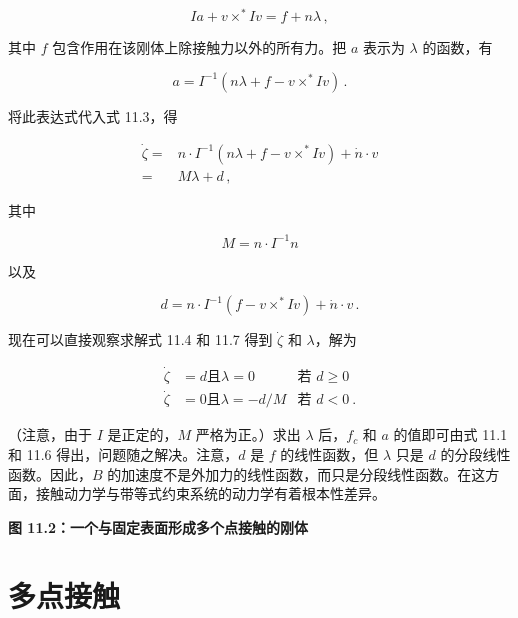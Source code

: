 \documentclass[10pt,a4paper]{book}
\theoremstyle{thmstyle} %
\theoremstyle{defstyle} %
\theoremstyle{prostyle} %
\begin{document}
$$
I a + v \times ^{*} I v = f + n \lambda \, ,
$$



其中 $f$ 包含作用在该刚体上除接触力以外的所有力。把 $a$ 表示为 $\lambda$ 的函数，有



$$
a = I ^{- 1} ( n \lambda + f - v \times ^{*} I v ) \, .
$$



将此表达式代入式 11.3，得



$$
\begin{array}{rl} { \dot { \zeta } = } & { n \cdot I ^{- 1} ( n \lambda + f - v \times ^{*} I v ) + \dot { n } \cdot v } \\{ = } & { M \lambda + d \, , } \end{array}
$$



其中



$$
M = n \cdot I ^{- 1} n
$$



以及



$$
d = n \cdot I ^{- 1} ( f - v \times ^{*} I v ) + \dot { n } \cdot v \, .
$$



现在可以直接观察求解式 11.4 和 11.7 得到 $\dot{\zeta}$ 和 $\lambda$，解为



$$
\begin{aligned}\dot\zeta&=d\text{且}\lambda=0&\text{若 }d\ge0\\\dot\zeta&=0\text{且}\lambda=-d/M&\text{若 }d<0\:.\end{aligned}
$$



（注意，由于 $I$ 是正定的，$M$ 严格为正。）求出 $\lambda$ 后，$f_c$ 和 $a$ 的值即可由式 11.1 和 11.6 得出，问题随之解决。注意，$d$ 是 $f$ 的线性函数，但 $\lambda$ 只是 $d$ 的分段线性函数。因此，$B$ 的加速度不是外加力的线性函数，而只是分段线性函数。在这方面，接触动力学与带等式约束系统的动力学有着根本性差异。



\noindent\textbf{图 11.2：一个与固定表面形成多个点接触的刚体}





\section{多点接触}
\end{document}
